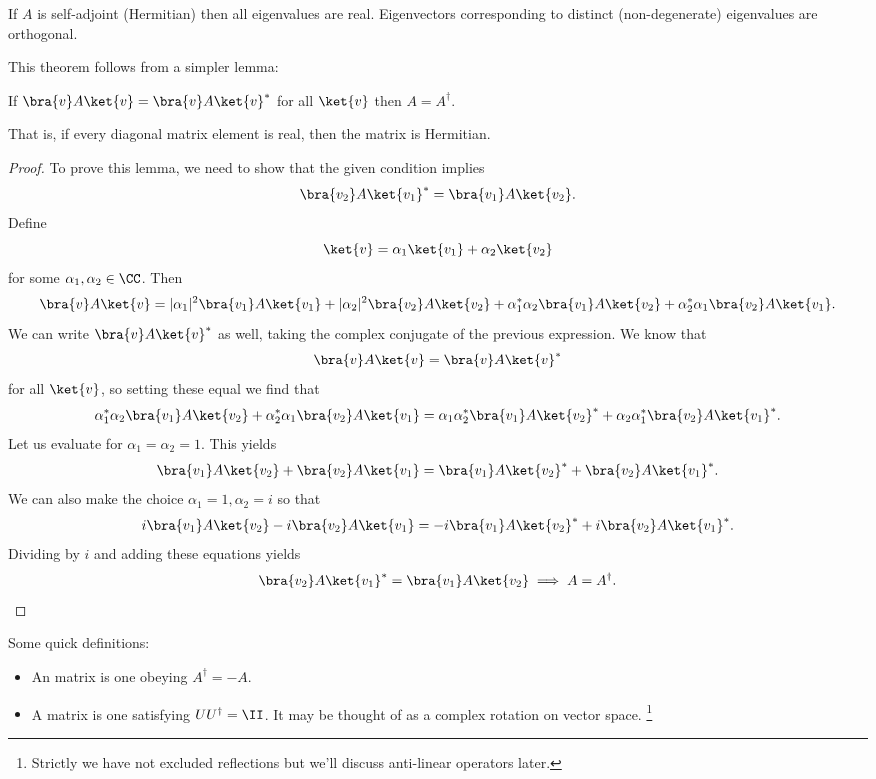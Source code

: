 \begin{thm}
    If $A$ is self-adjoint (Hermitian) then all eigenvalues are real. Eigenvectors corresponding to distinct (non-degenerate) eigenvalues are orthogonal.
\end{thm}
This theorem follows from a simpler lemma:
\begin{lem}
    If $\bra{v} A \ket{v}=\bra{v} A \ket{v}^*$ for all $\ket{v}$ then $A=A^\dagger.$
\end{lem}
That is, if every diagonal matrix element is real, then the matrix is Hermitian.
\begin{proof}
To prove this lemma, we need to show that the given condition implies
\begin{equation}
    \bra{v_2}A \ket{v_1}^*= \bra{v_1} A \ket{v_2}.
\end{equation}
Define 
\begin{equation}
    \ket{v}=\alpha_1 \ket{v_1} +\alpha_2 \ket{v_2}
\end{equation}
for some $\alpha_1,\alpha_2\in \CC$. Then
\begin{equation}
    \bra{v} A \ket{v} = |\alpha_1|^2 \bra{v_1} A \ket{v_1} + |\alpha_2|^2 \bra{v_2} A \ket{v_2} + \alpha_1 ^* \alpha_2 \bra{v_1} A \ket{v_2}  +\alpha_2^* \alpha_1 \bra{v_2} A \ket{v_1}.
\end{equation}
We can write $\bra{v}A \ket{v}^*$ as well, taking the complex conjugate of the previous expression. We know that
\begin{equation}
    \bra{v} A \ket{v}=\bra{v} A \ket{v}^*
\end{equation}
for all $\ket{v}$, so setting these equal we find that
\begin{equation}
    \alpha_1 ^* \alpha_2 \bra{v_1} A \ket{v_2}  +\alpha_2^* \alpha_1 \bra{v_2} A \ket{v_1} = \alpha_1 \alpha_2^* \bra{v_1} A \ket{v_2}^*  +\alpha_2 \alpha_1^* \bra{v_2} A \ket{v_1}^*.
\end{equation}
Let us evaluate for $\alpha_1=\alpha_2=1.$ This yields
\begin{equation}
    \bra{v_1}A \ket{v_2} + \bra{v_2} A\ket{v_1} = \bra{v_1} A \ket{v_2}^* + \bra{v_2} A \ket{v_1}^*.
\end{equation}
We can also make the choice $\alpha_1=1,\alpha_2=i$ so that
\begin{equation}
    i\bra{v_1}A \ket{v_2} -i\bra{v_2} A\ket{v_1} = -i\bra{v_1} A \ket{v_2}^* + i\bra{v_2} A \ket{v_1}^*.
\end{equation}
Dividing by $i$ and adding these equations yields
\begin{equation}
    \bra{v_2} A \ket{v_1}^* = \bra{v_1} A \ket{v_2} \implies A = A^\dagger.
\end{equation}
\end{proof}

Some quick definitions:
\begin{itemize}
    \item An  matrix is one obeying $A^\dagger=-A$.
    \item A  matrix is one satisfying $UU^\dagger = \II$. It may be thought of as a complex rotation on vector space.%
        \footnote{Strictly we have not excluded reflections but we'll discuss anti-linear operators later.}
\end{itemize}
    
